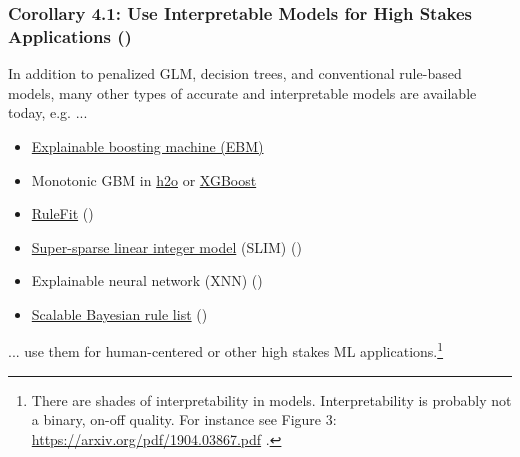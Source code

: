 \documentclass[11pt,
               aspectratio=169,
               hyperref={colorlinks}
               ]{beamer}
\begin{document}
	\begin{frame}


		\frametitle{\large{\textbf{Corollary 4.1}: Use Interpretable Models for High Stakes Applications (\citet{please_stop})}}
		
		In addition to penalized GLM, decision trees, and conventional rule-based models, many other types of accurate and interpretable models are available today, e.g. ...
		
		\begin{itemize}
			\item \href{https://github.com/microsoft/interpret}{Explainable boosting machine (EBM)}
			\item Monotonic GBM in \href{https://github.com/h2oai/h2o-3}{h2o} or \href{https://github.com/dmlc/xgboost}{XGBoost}
			\item \href{https://cran.r-project.org/web/packages/pre/index.html}{RuleFit} (\citet{rulefit})
			\item \href{https://github.com/ustunb/slim-python}{Super-sparse linear integer model} (SLIM)	(\citet{slim})
			\item Explainable neural network (XNN) (\citet{wf_xnn})
			\item \href{https://cran.r-project.org/web/packages/sbrl/index.html}{Scalable Bayesian rule list} (\citet{sbrl})
		\end{itemize}	

		... use them for human-centered or other high stakes ML applications.\footnote{\tiny{There are shades of interpretability in models. Interpretability is probably not a binary, on-off quality. For instance see Figure 3: \url{https://arxiv.org/pdf/1904.03867.pdf} \cite{molnar2019quantifying}.}}
	
	\end{frame}	
\end{document}
